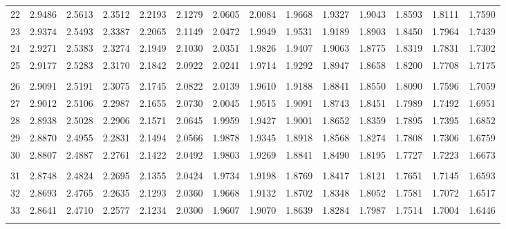 {\begin{tabular}{l|lllllllllllll}
 22 & 2.9486 & 2.5613 & 2.3512 & 2.2193 & 2.1279 & 2.0605 & 2.0084 & 1.9668 & 1.9327 & 1.9043 & 1.8593 & 1.8111 & 1.7590 \\[5pt] \arrayrulecolor{light-gray}\hline\arrayrulecolor{black}  
 23 & 2.9374 & 2.5493 & 2.3387 & 2.2065 & 2.1149 & 2.0472 & 1.9949 & 1.9531 & 1.9189 & 1.8903 & 1.8450 & 1.7964 & 1.7439 \\[5pt] \arrayrulecolor{light-gray}\hline\arrayrulecolor{black}  
 24 & 2.9271 & 2.5383 & 2.3274 & 2.1949 & 2.1030 & 2.0351 & 1.9826 & 1.9407 & 1.9063 & 1.8775 & 1.8319 & 1.7831 & 1.7302 \\[5pt] \arrayrulecolor{light-gray}\hline\arrayrulecolor{black}  
 25 & 2.9177 & 2.5283 & 2.3170 & 2.1842 & 2.0922 & 2.0241 & 1.9714 & 1.9292 & 1.8947 & 1.8658 & 1.8200 & 1.7708 & 1.7175 \\[5pt] \arrayrulecolor{light-gray}\hline\arrayrulecolor{black}  
\\ 
 26 & 2.9091 & 2.5191 & 2.3075 & 2.1745 & 2.0822 & 2.0139 & 1.9610 & 1.9188 & 1.8841 & 1.8550 & 1.8090 & 1.7596 & 1.7059 \\[5pt] \arrayrulecolor{light-gray}\hline\arrayrulecolor{black}  
 27 & 2.9012 & 2.5106 & 2.2987 & 2.1655 & 2.0730 & 2.0045 & 1.9515 & 1.9091 & 1.8743 & 1.8451 & 1.7989 & 1.7492 & 1.6951 \\[5pt] \arrayrulecolor{light-gray}\hline\arrayrulecolor{black}  
 28 & 2.8938 & 2.5028 & 2.2906 & 2.1571 & 2.0645 & 1.9959 & 1.9427 & 1.9001 & 1.8652 & 1.8359 & 1.7895 & 1.7395 & 1.6852 \\[5pt] \arrayrulecolor{light-gray}\hline\arrayrulecolor{black}  
 29 & 2.8870 & 2.4955 & 2.2831 & 2.1494 & 2.0566 & 1.9878 & 1.9345 & 1.8918 & 1.8568 & 1.8274 & 1.7808 & 1.7306 & 1.6759 \\[5pt] \arrayrulecolor{light-gray}\hline\arrayrulecolor{black}  
 30 & 2.8807 & 2.4887 & 2.2761 & 2.1422 & 2.0492 & 1.9803 & 1.9269 & 1.8841 & 1.8490 & 1.8195 & 1.7727 & 1.7223 & 1.6673 \\[5pt] \arrayrulecolor{light-gray}\hline\arrayrulecolor{black}  
\\ 
 31 & 2.8748 & 2.4824 & 2.2695 & 2.1355 & 2.0424 & 1.9734 & 1.9198 & 1.8769 & 1.8417 & 1.8121 & 1.7651 & 1.7145 & 1.6593 \\[5pt] \arrayrulecolor{light-gray}\hline\arrayrulecolor{black}  
 32 & 2.8693 & 2.4765 & 2.2635 & 2.1293 & 2.0360 & 1.9668 & 1.9132 & 1.8702 & 1.8348 & 1.8052 & 1.7581 & 1.7072 & 1.6517 \\[5pt] \arrayrulecolor{light-gray}\hline\arrayrulecolor{black}  
 33 & 2.8641 & 2.4710 & 2.2577 & 2.1234 & 2.0300 & 1.9607 & 1.9070 & 1.8639 & 1.8284 & 1.7987 & 1.7514 & 1.7004 & 1.6446 \\[5pt] \arrayrulecolor{light-gray}\hline\arrayrulecolor{black}  

\end{tabular}}
